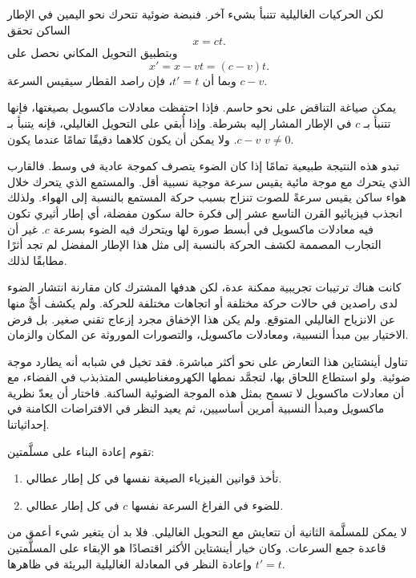 لكن الحركيات الغاليلية تتنبأ بشيء آخر. فنبضة ضوئية تتحرك نحو اليمين في الإطار الساكن تحقق
\begin{equation}
x=ct.
\end{equation}
وبتطبيق التحويل المكاني نحصل على
\begin{equation}
x'=x-vt=(c-v)t.
\end{equation}
وبما أن \(t'=t\)، فإن راصد القطار سيقيس السرعة \(c-v\).

يمكن صياغة التناقض على نحو حاسم. فإذا احتفظت معادلات ماكسويل بصيغتها، فإنها تتنبأ بـ \(c\) في الإطار المشار إليه بشرطة. وإذا أُبقي على التحويل الغاليلي، فإنه يتنبأ بـ \(c-v\). ولا يمكن أن يكون كلاهما دقيقًا تمامًا عندما يكون \(v\ne0\).

تبدو هذه النتيجة طبيعية تمامًا إذا كان الضوء يتصرف كموجة عادية في وسط. فالقارب الذي يتحرك مع موجة مائية يقيس سرعة موجية نسبية أقل. والمستمع الذي يتحرك خلال هواء ساكن يقيس سرعةً للصوت تنزاح بسبب حركة المستمع بالنسبة إلى الهواء. ولذلك انجذب فيزيائيو القرن التاسع عشر إلى فكرة حالة سكون مفضلة، أي إطار أثيري تكون فيه معادلات ماكسويل في أبسط صورة لها ويتحرك فيه الضوء بسرعة \(c\). غير أن التجارب المصممة لكشف الحركة بالنسبة إلى مثل هذا الإطار المفضل لم تجد أثرًا مطابقًا لذلك.

كانت هناك ترتيبات تجريبية ممكنة عدة، لكن هدفها المشترك كان مقارنة انتشار الضوء لدى راصدين في حالات حركة مختلفة أو اتجاهات مختلفة للحركة. ولم يكشف أيٌّ منها عن الانزياح الغاليلي المتوقع. ولم يكن هذا الإخفاق مجرد إزعاج تقني صغير. بل فرض الاختيار بين مبدأ النسبية، ومعادلات ماكسويل، والتصورات الموروثة عن المكان والزمان.

تناول أينشتاين هذا التعارض على نحو أكثر مباشرة. فقد تخيل في شبابه أنه يطارد موجة ضوئية. ولو استطاع اللحاق بها، لتجمَّد نمطها الكهرومغناطيسي المتذبذب في الفضاء، مع أن معادلات ماكسويل لا تسمح بمثل هذه الموجة الضوئية الساكنة. فاختار أن يعدّ نظرية ماكسويل ومبدأ النسبية أمرين أساسيين، ثم يعيد النظر في الافتراضات الكامنة في إحداثياتنا.

تقوم إعادة البناء على مسلَّمتين:
\begin{enumerate}
\item تأخذ قوانين الفيزياء الصيغة نفسها في كل إطار عطالي.
\item للضوء في الفراغ السرعة نفسها \(c\) في كل إطار عطالي.
\end{enumerate}

لا يمكن للمسلَّمة الثانية أن تتعايش مع التحويل الغاليلي. فلا بد أن يتغير شيء أعمق من قاعدة جمع السرعات. وكان خيار أينشتاين الأكثر اقتصادًا هو الإبقاء على المسلَّمتين وإعادة النظر في المعادلة الغاليلية البريئة في ظاهرها \(t'=t\).

